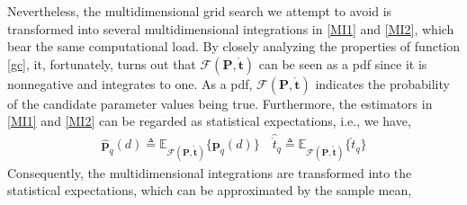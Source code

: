 \documentclass[review]{elsarticle}
\begin{document}
Nevertheless, the multidimensional grid search we attempt to avoid is transformed into several multidimensional integrations in \eqref{MI1} and \eqref{MI2}, which bear the same computational load. By closely analyzing the properties of function \eqref{gc}, it, fortunately, turns out that $\mathcal{F}(\boldsymbol{P},\mathring{\boldsymbol{t}})$ can be seen as a pdf since it is nonnegative and integrates to one. As a pdf, $\mathcal{F}(\boldsymbol{P},\mathring{\boldsymbol{t}})$ indicates the probability of the candidate parameter values being true. Furthermore, the estimators in \eqref{MI1} and \eqref{MI2} can be regarded as statistical expectations, i.e., we have,
\begin{align}\label{ex}
    \hat{\boldsymbol{p}}_q(d)\triangleq \mathbb{E}_{\mathcal{F}(\boldsymbol{P},\mathring{\boldsymbol{t}})}\{\boldsymbol{p}_q(d)\} \quad \hat{\mathring{t}}_q\triangleq \mathbb{E}_{\mathcal{F}(\boldsymbol{P},\mathring{\boldsymbol{t}})}\{\mathring{t}_q\}
\end{align}
Consequently, the multidimensional integrations are transformed into the statistical expectations, which can be approximated by the sample mean,
\end{document}
